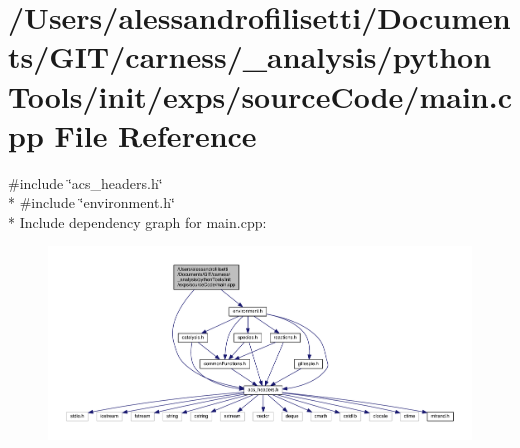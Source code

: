\hypertarget{a00068}{\section{/\+Users/alessandrofilisetti/\+Documents/\+G\+I\+T/carness/\+\_\+analysis/python\+Tools/init/exps/source\+Code/main.cpp File Reference}
\label{a00068}
}
{\ttfamily \#include \char`\"{}acs\+\_\+headers.\+h\char`\"{}}\\*
{\ttfamily \#include \char`\"{}environment.\+h\char`\"{}}\\*
Include dependency graph for main.\+cpp\+:\nopagebreak
\begin{figure}[H]
\begin{center}
\leavevmode
\includegraphics[width=350pt]{a00190}
\end{center}
\end{figure}
